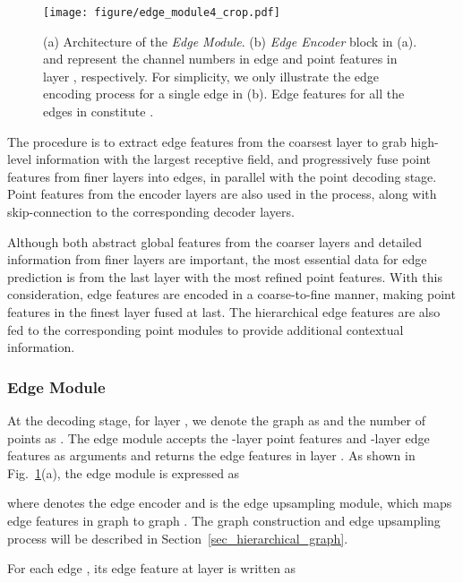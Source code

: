 \documentclass[10pt,twocolumn,letterpaper]{article}
\begin{document}
\begin{figure}[!t]
	\begin{center}
		\texttt{[image: figure/edge\_module4\_crop.pdf]}
	\end{center}
	\vspace{-2mm}
	\caption{(a) Architecture of the \textit{Edge Module}. (b) \textit{Edge Encoder} block in (a).  and  represent the channel numbers in edge and point features in layer , respectively. For simplicity, we only illustrate the edge encoding process for a single edge in (b). Edge features for all the edges in  constitute .}
	\label{fig_edge_module}
	\vspace{-4mm}
\end{figure}

The procedure is to extract edge features from the coarsest layer to grab high-level information with the largest receptive field, and progressively fuse point features from finer layers into edges, in parallel with the point decoding stage. Point features from the encoder layers are also used in the process, along with 
skip-connection to the corresponding decoder layers. 

Although both abstract global features from the coarser layers and detailed information from finer layers are important, the most essential data for edge prediction is from the last layer with the most refined point features. With this consideration, edge features are encoded in a coarse-to-fine manner, making point features in the finest layer fused at last. The hierarchical edge features are also fed to the corresponding point modules to provide additional contextual information.


\subsubsection{Edge Module}
\label{sec_edge_encoder}
At the decoding stage, 
for layer , we denote the graph as  and the number of points as .
The edge module accepts the -layer point features  and -layer edge features   as arguments and returns the edge features in layer . As shown in Fig.~\ref{fig_edge_module}(a), the edge module is expressed as 

where  denotes the edge encoder and  is the edge upsampling module, which maps edge features in graph  to graph . The graph construction and edge upsampling process will be described in Section~\ref{sec_hierarchical_graph}.

For each edge , its edge feature at layer  is written as
\end{document}
